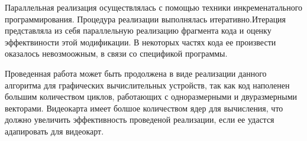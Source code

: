 \documentclass{matmex-diploma-custom}
\begin{document}
Параллельная  реализация осуществлялась с помощью техники инкременатального программирования. Процедура реализации выполнялась итеративно.Итерация представляла из себя параллельную реализацию фрагмента кода и оценку эффектвиности этой модификации. В некоторых частях кода ее произвести оказалось невозмоожным, в связи со спецификой программы.

Проведенная работа может быть продолжена в виде реализации данного алгоритма для графических вычислительных устройств, так как код наполенен большим количеством циклов, работающих с одноразмерными и двуразмерными векторами. Видеокарта имеет болшое количеством ядер для вычисления, что должно увеличить эффективность проведеной реализации, если ее удастся адапировать для видеокарт.

\nocite{*}


\end{document}
